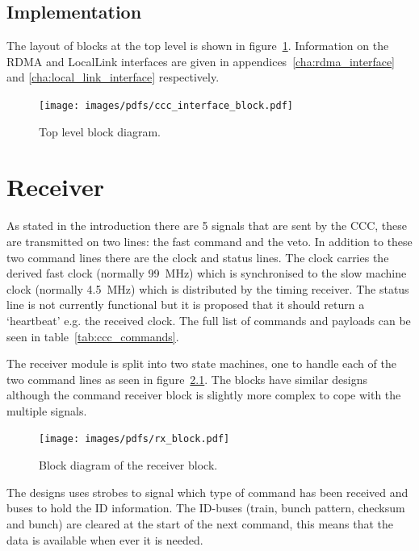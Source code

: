 \section{Implementation} %
\label{sub:top_implementation}
The layout of blocks at the top level is shown in figure~\ref{fig:ccc_interface_block}. Information on the RDMA and LocalLink interfaces are given in appendices~\ref{cha:rdma_interface} and \ref{cha:local_link_interface} respectively.
    
\begin{figure}[htbp]
    \centering
    \texttt{[image: images/pdfs/ccc\_interface\_block.pdf]}
    \caption{Top level block diagram.}
    \label{fig:ccc_interface_block}
\end{figure}
    
\chapter{Receiver} %
\label{cha:receiver}
As stated in the introduction there are 5 signals that are sent by the CCC, these are transmitted on two lines: the fast command and the veto. In addition to these two command lines there are the clock and status lines. The clock carries the derived fast clock (normally 99~MHz) which is synchronised to the slow machine clock (normally 4.5~MHz) which is distributed by the timing receiver. The status line is not currently functional but it is proposed that it should return a `heartbeat' e.g. the received clock. The full list of commands and payloads can be seen in table~\ref{tab:ccc_commands}.
  
The receiver module is split into two state machines, one to handle each of the two command lines as seen in figure~\ref{fig:rx_block}. The blocks have similar designs although the command receiver block is slightly more complex to cope with the multiple signals. 
\begin{figure}[htbp] 
    \centering
    \texttt{[image: images/pdfs/rx\_block.pdf]}
    \caption{Block diagram of the receiver block.}
    \label{fig:rx_block}
\end{figure}
  
The designs uses strobes to signal which type of command has been received and buses to hold the ID information. The ID-buses (train, bunch pattern, checksum and bunch) are cleared at the start of the next command, this means that the data is available when ever it is needed.
  
